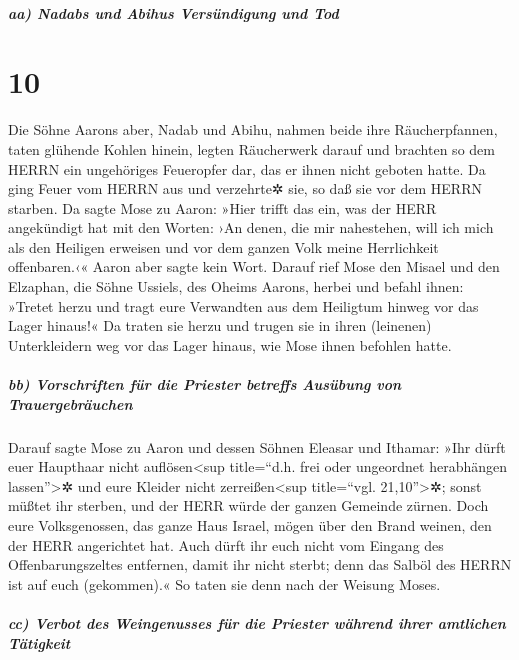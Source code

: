 \hypertarget{aa-nadabs-und-abihus-versuxfcndigung-und-tod}{%
\subparagraph{aa) Nadabs und Abihus Versündigung und
Tod}\label{aa-nadabs-und-abihus-versuxfcndigung-und-tod}}

\hypertarget{section-9}{%
\section{10}\label{section-9}}

Die Söhne Aarons aber, Nadab und Abihu, nahmen beide ihre
Räucherpfannen, taten glühende Kohlen hinein, legten Räucherwerk darauf
und brachten so dem HERRN ein ungehöriges Feueropfer dar, das er ihnen
nicht geboten hatte. Da ging Feuer vom HERRN aus und
verzehrte✲ sie, so daß sie vor dem HERRN starben. Da sagte
Mose zu Aaron: »Hier trifft das ein, was der HERR angekündigt hat mit
den Worten: ›An denen, die mir nahestehen, will ich mich als den
Heiligen erweisen und vor dem ganzen Volk meine Herrlichkeit
offenbaren.‹« Aaron aber sagte kein Wort. Darauf rief Mose
den Misael und den Elzaphan, die Söhne Ussiels, des Oheims Aarons,
herbei und befahl ihnen: »Tretet herzu und tragt eure Verwandten aus dem
Heiligtum hinweg vor das Lager hinaus!« Da traten sie
herzu und trugen sie in ihren (leinenen) Unterkleidern weg vor das Lager
hinaus, wie Mose ihnen befohlen hatte.

\hypertarget{bb-vorschriften-fuxfcr-die-priester-betreffs-ausuxfcbung-von-trauergebruxe4uchen}{%
\subparagraph{bb) Vorschriften für die Priester betreffs Ausübung von
Trauergebräuchen}\label{bb-vorschriften-fuxfcr-die-priester-betreffs-ausuxfcbung-von-trauergebruxe4uchen}}

Darauf sagte Mose zu Aaron und dessen Söhnen Eleasar und
Ithamar: »Ihr dürft euer Haupthaar nicht auflösen\textless sup
title=``d.h. frei oder ungeordnet herabhängen lassen''\textgreater✲ und
eure Kleider nicht zerreißen\textless sup title=``vgl.
21,10''\textgreater✲; sonst müßtet ihr sterben, und der HERR würde der
ganzen Gemeinde zürnen. Doch eure Volksgenossen, das ganze Haus Israel,
mögen über den Brand weinen, den der HERR angerichtet hat.
Auch dürft ihr euch nicht vom Eingang des
Offenbarungszeltes entfernen, damit ihr nicht sterbt; denn das Salböl
des HERRN ist auf euch (gekommen).« So taten sie denn nach der Weisung
Moses.

\hypertarget{cc-verbot-des-weingenusses-fuxfcr-die-priester-wuxe4hrend-ihrer-amtlichen-tuxe4tigkeit}{%
\subparagraph{cc) Verbot des Weingenusses für die Priester während ihrer
amtlichen
Tätigkeit}\label{cc-verbot-des-weingenusses-fuxfcr-die-priester-wuxe4hrend-ihrer-amtlichen-tuxe4tigkeit}}

